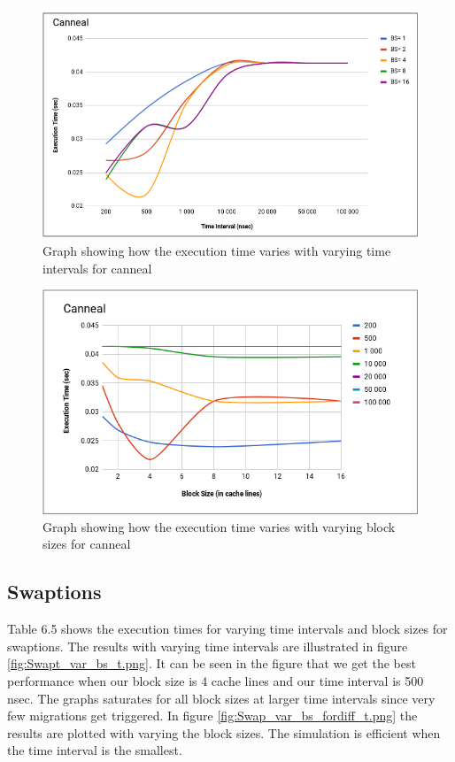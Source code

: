 \documentclass{listhesis}
\begin{document}
\begin{figure}
  \includegraphics[width=\linewidth]{cann_var_bs_t.png}
  \centering
  \caption{Graph showing how the execution time varies with varying time intervals for canneal}
  \label{fig:cann_var_bs_t.png}
\end{figure}

\begin{figure}
  \includegraphics[width=\linewidth]{Cann_var_bs_fordiff_t.png}
  \centering
  \caption{Graph showing how the execution time varies with varying block sizes for canneal}
  \label{fig:Cann_var_bs_fordiff_t.png}
\end{figure}

\subsection{Swaptions}
Table 6.5 shows the execution times for varying time intervals and block sizes for swaptions. The results with varying time intervals are illustrated in figure \ref{fig:Swapt_var_bs_t.png}. It can be seen in the figure that we get the best performance when our block size is 4 cache lines and our time interval is 500 nsec. The graphs saturates for all block sizes at larger time intervals since very few migrations get triggered. In figure \ref{fig:Swap_var_bs_fordiff_t.png} the results are plotted with varying the block sizes. The simulation is efficient when the time interval is the smallest.
\end{document}
